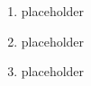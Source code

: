 \documentclass[12pt, letterpaper]{article}
\begin{document}
\begin{enumerate}[label=\bfseries3\alph*)]

\item placeholder

\item placeholder

\item placeholder

\end{enumerate}
\end{document}
